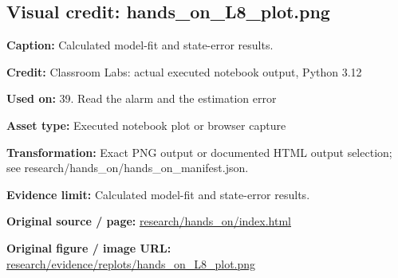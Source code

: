 \documentclass[10pt,letterpaper]{article}
\begin{document}
\subsection*{Visual credit: hands\_on\_L8\_plot.png}
\textbf{Caption:} Calculated model-fit and state-error results.\par
\textbf{Credit:} Classroom Labs: actual executed notebook output, Python 3.12\par
\textbf{Used on:} 39. Read the alarm and the estimation error\par
\textbf{Asset type:} Executed notebook plot or browser capture\par
\textbf{Transformation:} Exact PNG output or documented HTML output selection; see research/hands\_on/hands\_on\_manifest.json.\par
\textbf{Evidence limit:} Calculated model-fit and state-error results.\par
\textbf{Original source / page:} \href{../research/hands_on/index.html}{\small\ttfamily research/\allowbreak{}hands\_\allowbreak{}on/\allowbreak{}index.\allowbreak{}html}\par
\textbf{Original figure / image URL:} \href{../research/evidence/replots/hands_on_L8_plot.png}{\small\ttfamily research/\allowbreak{}evidence/\allowbreak{}replots/\allowbreak{}hands\_\allowbreak{}on\_\allowbreak{}L8\_\allowbreak{}plot.\allowbreak{}png}\par
\par\medskip
\end{document}
